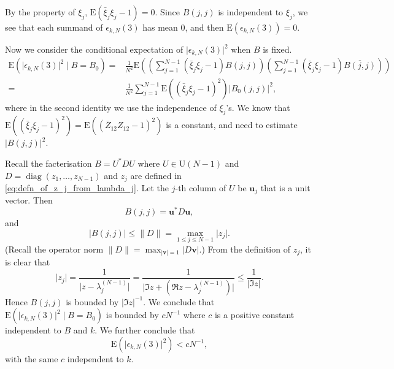 \documentclass[11pt, a4paper]{article}
\numberwithin{equation}{section}
\newcommand{\E}{\mathrm{E}}
\newcommand{\Unitary}{\mathrm{U}}
\renewcommand{\vec}[1]{\mathbf{#1}}
\DeclareMathOperator{\diag}{diag}
\theoremstyle{definition}
\theoremstyle{remark}
\begin{document}
By the property of $\xi_j$, $\E(\bar{\xi}_j \xi_j - 1) = 0$. Since $B(j, j)$ is independent to $\xi_j$, we see that each summand of $\epsilon_{k, N}(3)$ has mean $0$, and then $\E(\epsilon_{k, N}(3)) = 0$.

Now we consider the conditional expectation of $\lvert \epsilon_{k, N}(3) \rvert^2$ when $B$ is fixed.
\begin{equation}
  \begin{split}
    \E(\lvert \epsilon_{k, N}(3) \rvert^2 \mid B = B_0) = {}& \frac{1}{N^2} \E \left( \left( \sum^{N - 1}_{j = 1} (\bar{\xi}_j \xi_j - 1) B(j, j) \right) \left( \sum^{N - 1}_{j = 1} (\bar{\xi}_j \xi_j - 1) \overline{B(j, j)} \right) \right) \\
    = {}& \frac{1}{N^2} \sum^{N - 1}_{j = 1} \E((\bar{\xi}_j \xi_j - 1)^2) \lvert B_0(j, j) \rvert^2,
  \end{split}
\end{equation}
where in the second identity we use the independence of $\xi_j$'s. We know that $\E((\bar{\xi}_j \xi_j - 1)^2) = \E((\bar{Z}_{12} Z_{12} - 1)^2)$ is a constant, and need to estimate $\lvert B(j, j) \rvert^2$.

Recall the facterisation $B = U^* D U$ where $U \in \Unitary(N - 1)$ and $D = \diag(z_1, \dotsc, z_{N - 1})$ and $z_j$ are defined in \eqref{eq:defn_of_z_j_from_lambda_j}. Let the $j$-th column of $U$ be $\vec{u}_j$ that is a unit vector. Then
\begin{equation}
  B(j, j) = \vec{u}^* D \vec{u},
\end{equation}
and
\begin{equation}
  \lvert B(j, j) \rvert \leq \lVert D \rVert = \max_{1 \leq j \leq N - 1} \lvert z_j \rvert.
\end{equation}
(Recall the operator norm $\lVert D \rVert = \max_{\lvert \vec{v} \rvert = 1} \lvert D \vec{v} \rvert$.) From the definition of $z_j$, it is clear that
\begin{equation}
  \lvert z_j \rvert = \frac{1}{\lvert z - \lambda^{(N - 1)}_j \rvert} = \frac{1}{\lvert \Im z + (\Re z - \lambda^{(N - 1)}_j) \rvert} \leq \frac{1}{\lvert \Im z \rvert}.
\end{equation}
Hence $B(j, j)$ is bounded by $\lvert \Im z \rvert^{-1}$. We conclude that $\E(\lvert \epsilon_{k, N}(3) \rvert^2 \mid B = B_0)$ is bounded by $cN^{-1}$ where $c$ is a positive constant independent to $B$ and $k$. We further conclude that
\begin{equation} \label{eq:2nd_moment_Stieltjes}
  \E(\lvert \epsilon_{k, N}(3) \rvert^2) < cN^{-1},
\end{equation}
with the same $c$ independent to $k$.
\end{document}
